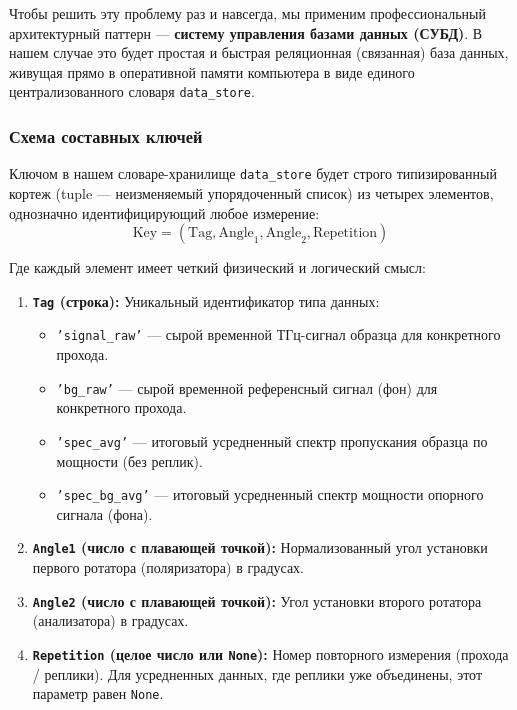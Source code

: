 Чтобы решить эту проблему раз и навсегда, мы применим профессиональный архитектурный паттерн — \textbf{систему управления базами данных (СУБД)}. В нашем случае это будет простая и быстрая реляционная (связанная) база данных, живущая прямо в оперативной памяти компьютера в виде единого централизованного словаря \texttt{data\_store}.

\subsubsection{Схема составных ключей}

Ключом в нашем словаре-хранилище \texttt{data\_store} будет строго типизированный кортеж (tuple — неизменяемый упорядоченный список) из четырех элементов, однозначно идентифицирующий любое измерение:
\begin{equation}
\text{Key} = (\text{Tag}, \text{Angle}_1, \text{Angle}_2, \text{Repetition})
\end{equation}

Где каждый элемент имеет четкий физический и логический смысл:
\begin{enumerate}
    \item \textbf{\texttt{Tag} (строка):} Уникальный идентификатор типа данных:
    \begin{itemize}
        \item \texttt{'signal\_raw'} — сырой временной ТГц-сигнал образца для конкретного прохода.
        \item \texttt{'bg\_raw'} — сырой временной референсный сигнал (фон) для конкретного прохода.
        \item \texttt{'spec\_avg'} — итоговый усредненный спектр пропускания образца по мощности (без реплик).
        \item \texttt{'spec\_bg\_avg'} — итоговый усредненный спектр мощности опорного сигнала (фона).
    \end{itemize}
    \item \textbf{\texttt{Angle1} (число с плавающей точкой):} Нормализованный угол установки первого ротатора (поляризатора) в градусах.
    \item \textbf{\texttt{Angle2} (число с плавающей точкой):} Угол установки второго ротатора (анализатора) в градусах.
    \item \textbf{\texttt{Repetition} (целое число или \texttt{None}):} Номер повторного измерения (прохода / реплики). Для усредненных данных, где реплики уже объединены, этот параметр равен \texttt{None}.
\end{enumerate}

